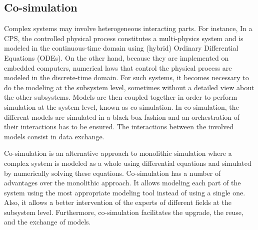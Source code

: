 \subsection{Co-simulation}

Complex systems may involve heterogeneous interacting parts. For instance, In a CPS, the controlled physical process constitutes a multi-physics system and is modeled in the continuous-time domain using (hybrid) Ordinary Differential Equations (ODEs). On the other hand, because they are implemented on embedded computers, numerical laws that control the physical process are modeled in the discrete-time domain. For such systems, it becomes necessary to do the modeling at the subsystem level, sometimes without a detailed view about the other subsystems. Models are then coupled together in order to perform simulation at the system level, known as co-simulation. In co-simulation, the different models are simulated in a black-box fashion and an orchestration of their interactions has to be ensured. The interactions between the involved models consist in data exchange.

Co-simulation is an alternative approach to monolithic simulation where a complex system is modeled as a whole using differential equations and simulated by numerically solving these equations. Co-simulation has a number of advantages over the monolithic approach. It allows modeling each part of the system using the most appropriate modeling tool instead of using a single one. Also, it allows a better intervention of the experts of different fields at the subsystem level. Furthermore, co-simulation facilitates the upgrade, the reuse, and the exchange of models. 

